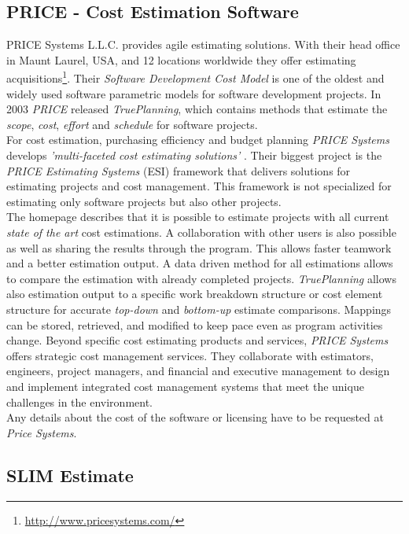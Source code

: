 \subsection{PRICE - Cost Estimation Software}

PRICE Systems L.L.C. provides agile estimating solutions. With their head office in Maunt Laurel, USA, and 12 locations worldwide they offer estimating acquisitions\footnote{\url{http://www.pricesystems.com/}}. Their \textit{Software Development Cost Model} is one of the oldest and widely used software parametric models for software development projects. In 2003 \textit{PRICE} released \textit{TruePlanning}, which contains methods that estimate the \textit{scope}, \textit{cost}, \textit{effort} and \textit{schedule} for software projects.
\\
For cost estimation, purchasing efficiency and budget planning \textit{PRICE Systems} develops \textit{'multi-faceted cost estimating solutions'} \cite{pricesystems}. Their biggest project is the \textit{PRICE Estimating Systems} (ESI) framework that delivers solutions for estimating projects and cost management. This framework is not specialized for estimating only software projects but also other projects.
\\
The homepage describes that it is possible to estimate projects with all current \textit{state of the art} cost estimations. A collaboration with other users is also possible as well as sharing the results through the program. This allows faster teamwork and a better estimation output. A data driven method for all estimations allows to compare the estimation with already completed projects. \textit{TruePlanning} allows also estimation output to a specific work breakdown structure or cost element structure for accurate \textit{top-down} and \textit{bottom-up} estimate comparisons. Mappings can be stored, retrieved, and modified to keep pace even as program activities change. Beyond specific cost estimating products and services, \textit{PRICE Systems} offers strategic cost management services. They collaborate with estimators, engineers, project managers, and financial and executive management to design and implement integrated cost management systems that meet the unique challenges in the environment.
\\
Any details about the cost of the software or licensing have to be requested at \textit{Price Systems}.

\subsection{SLIM Estimate}


